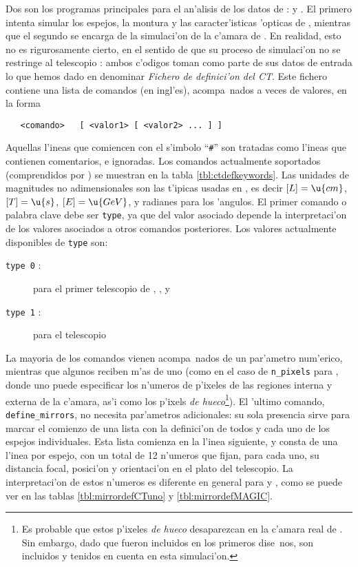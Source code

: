Dos son los programas principales para el an'alisis de los datos de
\MC:  y \camera. El primero intenta simular los espejos, la
montura y las caracter'isticas 'opticas de \MAGIC, mientras que el
segundo se encarga de la simulaci'on de la c'amara de \MAGIC. En
realidad, esto no es rigurosamente cierto, en el sentido de que su
proceso de simulaci'on no se restringe al telescopio \MAGIC: ambos
c'odigos toman como parte de sus datos de entrada lo que hemos dado en
denominar \emph{Fichero de definici'on del CT}.  Este fichero contiene
una lista de comandos (en ingl'es), acompa~nados a veces de valores,
en la forma
%
\begin{verbatim}
   <comando>   [ <valor1> [ <valor2> ... ] ]
\end{verbatim}
%
Aquellas l'ineas que comiencen con el s'imbolo ``\texttt{\#}'' son
tratadas como l'ineas que contienen comentarios, e ignoradas.  Los
comandos actualmente soportados (comprendidos por ) se
muestran en la tabla \ref{tbl:ctdefkeywords}.  Las unidades de
magnitudes no adimensionales son las t'ipicas usadas en \CORSIKA, es
decir $[L]=\u{cm}$, $[T]=\u{s}$, $[E]=\u{GeV}$, y radianes para los
'angulos.  El primer comando o palabra clave debe ser \texttt{type},
ya que del valor asociado depende la interpretaci'on de los valores
asociados a otros comandos posteriores.  Los valores actualmente
disponibles de \texttt{type} son:
%
\begin{description}
\item[\texttt{type 0} :] para el primer telescopio de \HEGRA, \CTuno, y
\item[\texttt{type 1} :] para el telescopio \MAGIC
\end{description}
%
La mayoria de los comandos vienen acompa~nados de un par'ametro
num'erico, mientras que algunos reciben m'as de uno (como en el caso
de \texttt{n\_pixels} para \MAGIC, donde uno puede especificar los
n'umeros de p'ixeles de las regiones interna y externa de la c'amara,
as'i como los p'ixels \emph{de hueco}\footnote{Es probable que estos
  p'ixeles \emph{de hueco} desaparezcan en la c'amara real de \MAGIC.
  Sin embargo, dado que fueron incluidos en los primeros dise~nos, son
  incluidos y tenidos en cuenta en esta simulaci'on.}).  El 'ultimo
comando, \texttt{define\_mirrors}, no necesita par'ametros
adicionales: su sola presencia sirve para marcar el comienzo de una
lista con la definici'on de todos y cada uno de los espejos
individuales.  Esta lista comienza en la l'inea siguiente, y consta de
una l'inea por espejo, con un total de 12 n'umeros que fijan, para
cada uno, su distancia focal, posici'on y orientaci'on en el plato del
telescopio.  La interpretaci'on de estos n'umeros es diferente en
general para \MAGIC y \CTuno, como se puede ver en las tablas
\ref{tbl:mirrordefCTuno} y \ref{tbl:mirrordefMAGIC}.


